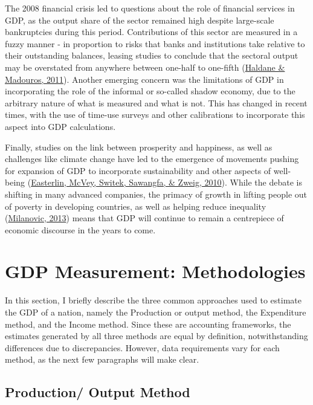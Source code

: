\documentclass[12pt,nobind, a4paper]{reedthesis}
\begin{document}
 The 2008 financial crisis led to questions about the role of financial services in GDP, as the output share of the sector remained high despite large-scale bankruptcies during this period. Contributions of this sector are measured in a fuzzy manner - in proportion to risks that banks and institutions take relative to their outstanding balances, leasing studies to conclude that the sectoral output may be overstated from anywhere between one-half to one-fifth (\protect\hyperlink{ref-haldane_what_2011}{Haldane \& Madouros, 2011}). Another emerging concern was the limitations of GDP in incorporating the role of the informal or so-called shadow economy, due to the arbitrary nature of what is measured and what is not. This has changed in recent times, with the use of time-use surveys and other calibrations to incorporate this aspect into GDP calculations.
 \linebreak

 Finally, studies on the link between prosperity and happiness, as well as challenges like climate change have led to the emergence of movements pushing for expansion of GDP to incorporate sustainability and other aspects of well-being (\protect\hyperlink{ref-easterlin_happinessincome_2010}{Easterlin, McVey, Switek, Sawangfa, \& Zweig, 2010}). While the debate is shifting in many advanced companies, the primacy of growth in lifting people out of poverty in developing countries, as well as helping reduce inequality (\protect\hyperlink{ref-milanovic_global_2013}{Milanovic, 2013}) means that GDP will continue to remain a centrepiece of economic discourse in the years to come.

 \hypertarget{gdp-measurement-methodologies}{%
 \section{GDP Measurement: Methodologies}\label{gdp-measurement-methodologies}}

 In this section, I briefly describe the three common approaches used to estimate the GDP of a nation, namely the Production or output method, the Expenditure method, and the Income method. Since these are accounting frameworks, the estimates generated by all three methods are equal by definition, notwithstanding differences due to discrepancies. However, data requirements vary for each method, as the next few paragraphs will make clear.

 \hypertarget{production-output-method}{%
 \subsection{Production/ Output Method}\label{production-output-method}}
\end{document}
